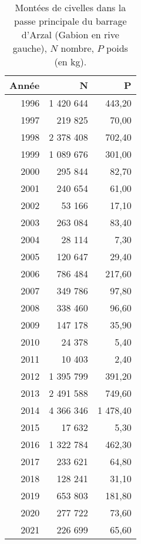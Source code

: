 \begin{table}[htbp]
\centering
\begin{tabular}{rrr}
  \hline
Année & N & P \\ 
  \hline
1996 & 1 420 644 & 443,20 \\ 
  1997 & 219 825 & 70,00 \\ 
  1998 & 2 378 408 & 702,40 \\ 
  1999 & 1 089 676 & 301,00 \\ 
  2000 & 295 844 & 82,70 \\ 
  2001 & 240 654 & 61,00 \\ 
  2002 & 53 166 & 17,10 \\ 
  2003 & 263 084 & 83,40 \\ 
  2004 & 28 114 & 7,30 \\ 
  2005 & 120 647 & 29,40 \\ 
  2006 & 786 484 & 217,60 \\ 
  2007 & 349 786 & 97,80 \\ 
  2008 & 338 460 & 96,60 \\ 
  2009 & 147 178 & 35,90 \\ 
  2010 & 24 378 & 5,40 \\ 
  2011 & 10 403 & 2,40 \\ 
  2012 & 1 395 799 & 391,20 \\ 
  2013 & 2 491 588 & 749,60 \\ 
  2014 & 4 366 346 & 1 478,40 \\ 
  2015 & 17 632 & 5,30 \\ 
  2016 & 1 322 784 & 462,30 \\ 
  2017 & 233 621 & 64,80 \\ 
  2018 & 128 241 & 31,10 \\ 
  2019 & 653 803 & 181,80 \\ 
  2020 & 277 722 & 73,60 \\ 
  2021 & 226 699 & 65,60 \\ 
   \hline
\end{tabular}
\caption{Montées de civelles dans la passe principale du barrage d'Arzal (Gabion en rive gauche), $N$ nombre,
		$P$ poids (en kg).} 
\label{table_civelle_6}
\end{table}

